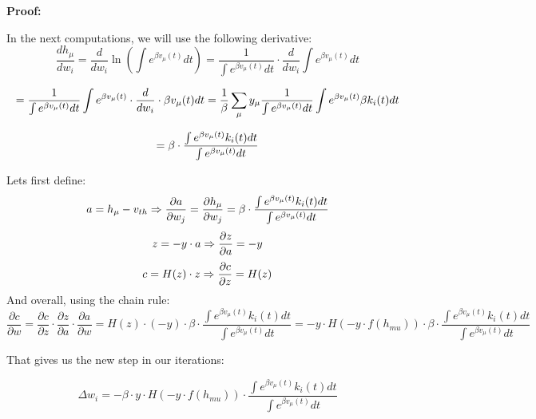 \textbf{Proof:}

In the next computations, we will use the following derivative:
\begin{equation}
    \frac{dh_{\mu}}{dw_i} = \frac{d}{dw_i}\ln\left(\int e^{\beta v_{\mu}(t)} dt\right) = \frac{1}{\int e^{\beta v_{\mu}(t)} dt} \cdot \frac{d}{dw_i}\int e^{\beta v_{\mu}(t)} dt
\end{equation}

\begin{equation} \notag
= \frac{1}{\int e^{\beta v_{\mu}(t)} dt}\int e^{\beta v_{\mu}(t)} \cdot \frac{d}{dw_i} \cdot \beta v_{\mu}(t) dt = \frac{1}{\beta}\sum_{\mu}{y_{\mu}\frac{1}{\int e^{\beta v_{\mu}(t)} dt}\int e^{\beta v_{\mu}(t)} \beta k_i(t) dt}
\end{equation}

\begin{equation} \notag
= \beta \cdot \frac{\int e^{\beta v_{\mu}(t)} k_i(t) dt}{\int e^{\beta v_{\mu}(t)} dt}
\end{equation}

Lets first define:
\begin{equation} \notag
    a = h_{\mu} - v_{th} \Rightarrow \frac{\partial{a}}{\partial{w_j}} = \frac{\partial{h_{\mu}}}{\partial{w_j}} = \beta \cdot \frac{\int e^{\beta v_{\mu}(t)} k_i(t) dt}{\int e^{\beta v_{\mu}(t)} dt}
\end{equation}
\begin{equation} \notag
    z = -y \cdot a \Rightarrow \frac{\partial{z}}{\partial{a}} = -y
\end{equation}
\begin{equation} \notag
    c = H(z) \cdot z \Rightarrow \frac{\partial{c}}{\partial{z}} = H(z)
\end{equation}
And overall, using the chain rule:
\begin{equation}
    \frac{\partial{c}}{\partial{w}} = \frac{\partial{c}}{\partial{z}} \cdot \frac{\partial{z}}{\partial{a}} \cdot \frac{\partial{a}}{\partial{w}} = H(z) \cdot (-y) \cdot \beta \cdot \frac{\int e^{\beta v_{\mu}(t)} k_i(t) dt}{\int e^{\beta v_{\mu}(t)} dt} = -y \cdot H(-y \cdot f(h_{mu})) \cdot \beta \cdot \frac{\int e^{\beta v_{\mu}(t)} k_i(t) dt}{\int e^{\beta v_{\mu}(t)} dt}
\end{equation}

That gives us the new step in our iterations:

\begin{equation}
\Delta w_i =- \beta \cdot y \cdot H(-y \cdot f(h_{mu})) \cdot \frac{\int e^{\beta v_{\mu}(t)} k_i(t) dt}{\int e^{\beta v_{\mu}(t)} dt}
\end{equation}

